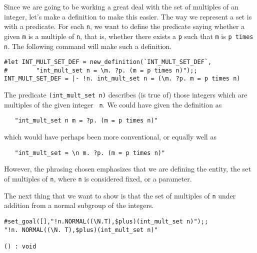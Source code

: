 Since we are going to be working a great deal with the set of
multiples of an integer, let's make a definition to make this easier.
The way we represent a set is with a predicate.   For each {\small\tt n},
we  want to define the predicate saying whether a given {\small\tt m}
is a multiple of {\small\tt n}, that is, whether there exists a
{\small\tt p} such that {\small\tt m} is {\small\verb+p times n+}.
The following command will make such a definition. 

\begin{session}
\begin{verbatim}
#let INT_MULT_SET_DEF = new_definition(`INT_MULT_SET_DEF`,
#        "int_mult_set n = \m. ?p. (m = p times n)");;
INT_MULT_SET_DEF = |- !n. int_mult_set n = (\m. ?p. m = p times n)
\end{verbatim}
\end{session}

The predicate {\small\verb+(int_mult_set n)+} describes (is true
of) those integers which are multiples of the given integer {\small\tt
n}.  We could have given the definition as
\begin{verbatim}
   "int_mult_set n m = ?p. (m = p times n)"
\end{verbatim}
which would have perhaps been more conventional, or equally well as
\begin{verbatim}
   "int_mult_set = \n m. ?p. (m = p times n)"
\end{verbatim}
However, the phrasing chosen emphasizes that we are defining the
entity, the set of multiples of {\small\tt n}, where {\small\tt n} is
considered fixed, or a parameter.

The next thing that we want to show is that the set of multiples of
{\small\tt n} under addition from a normal subgroup of the integers.
\begin{session}
\begin{verbatim}
#set_goal([],"!n.NORMAL((\N.T),$plus)(int_mult_set n)");;
"!n. NORMAL((\N. T),$plus)(int_mult_set n)"

() : void
\end{verbatim}
\end{session}

